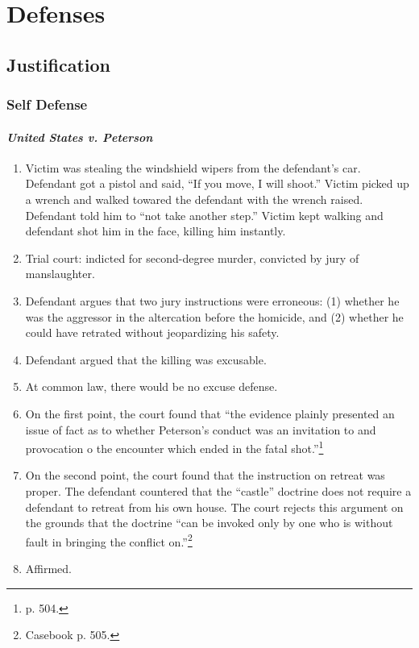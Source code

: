 \section{Defenses}

\subsection{Justification}

\subsubsection{Self Defense}

\paragraph{\emph{United States v. Peterson}}

\begin{enumerate}
    \item Victim was stealing the windshield wipers from the defendant's car. Defendant got a pistol and said, ``If you move, I will shoot.'' Victim picked up a wrench and walked towared the defendant with the wrench raised. Defendant told him to ``not take another step.'' Victim kept walking and defendant shot him in the face, killing him instantly.
    \item Trial court: indicted for second-degree murder, convicted by jury of manslaughter.
    \item Defendant argues that two jury instructions were erroneous: (1) whether he was the aggressor in the altercation before the homicide, and (2) whether he could have retrated without jeopardizing his safety.
    \item Defendant argued that the killing was excusable.
    \item At common law, there would be no excuse defense. %
    \item On the first point, the court found that ``the evidence plainly presented an issue of fact as to whether Peterson's conduct was an invitation to and provocation o the encounter which ended in the fatal shot.''\footnote{p. 504.}
    \item On the second point, the court found that the instruction on retreat was proper. The defendant countered that the ``castle'' doctrine does not require a defendant to retreat from his own house. The court rejects this argument on the grounds that the doctrine ``can be invoked only by one who is without fault in bringing the conflict on.''\footnote{Casebook p. 505.}
    \item Affirmed.
\end{enumerate}

